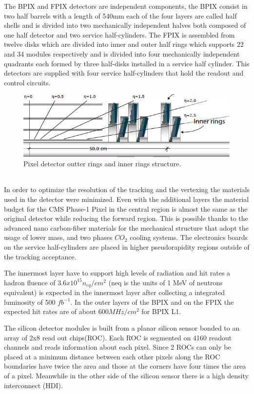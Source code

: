 The BPIX and FPIX detectors are independent components, the BPIX consist in two half barrels with a length of 540mm each of the four layers are called half shells and is divided into two mechanically independent halves both composed of one half detector and two service half-cylinders. The FPIX is assembled from twelve disks which are divided into inner and outer half rings which supports 22 and 34 modules respectively and is divided into four mechanically independent quadrants each formed by three half-disks installed in a service half cylinder. This detectors are supplied with four service half-cylinders that hold the readout and control circuits.
\\
\begin{figure}[h]
    \centering
    \includegraphics[width=1\textwidth]{pixeldetector.png}     
    \caption{Pixel detector outter rings and inner rings structure. \cite{pxdpic}}
    \label{fig:PixelDetector}
\end{figure}

\\
In order to optimize the resolution of the tracking and the vertexing the materials used in the detector were minimized. Even with the additional layers the material budget for the CMS Phase-1 Pixel in the central region is almost the same as the original detector while reducing the forward region. This is possible thanks to the advanced nano carbon-fiber materials for the mechanical structure that adopt the usage of lower mass, and two phases $CO_{2}$ cooling systems. The electronics boards on the service half-cylinders are placed in higher pseudorapidity regions outside of the tracking acceptance. 

The innermost layer have to support high levels of radiation and hit rates a hadron fluence of $3.6x10^{15} n_{eq}/cm^{2}$ (neq is the units of 1 MeV of neutrons equivalent) is expected in the innermost layer after collecting a integrated luminosity of 500 $fb^{-1}$. In the outer layers of the BPIX and on the FPIX the expected hit rates are of about $600 MHz/cm^{2}$ for BPIX L1. 

The silicon detector modules is built from a planar silicon sensor bonded to an array of 2x8 read out chips(ROC). Each ROC is segmented on 4160 readout channels and reads information about each pixel. Since 2 ROCs can only be placed at a minimum distance between each other pixels along the ROC boundaries have twice the area and those at the corners have four times the area of a pixel. Meanwhile in the other side of the silicon sensor there is a high density interconnect (HDI). 

